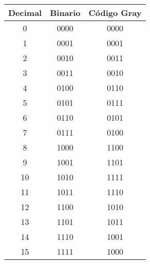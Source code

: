 \documentclass[a4paper,12pt]{article}
\begin{document}
	
	
	\begin{table}[h!]
		\centering
		\large
		\begin{tabular}{|c|c|c|}
			\hline
			Decimal & Binario & Código Gray \\
			\hline
			0  & 0000 & 0000 \\
			1  & 0001 & 0001 \\
			2  & 0010 & 0011 \\
			3  & 0011 & 0010 \\
			4  & 0100 & 0110 \\
			5  & 0101 & 0111 \\
			6  & 0110 & 0101 \\
			7  & 0111 & 0100 \\
			8  & 1000 & 1100 \\
			9  & 1001 & 1101 \\
			10 & 1010 & 1111 \\
			11 & 1011 & 1110 \\
			12 & 1100 & 1010 \\
			13 & 1101 & 1011 \\
			14 & 1110 & 1001 \\
			15 & 1111 & 1000 \\
			\hline
		\end{tabular}
		
	\end{table}



	
\end{document}
